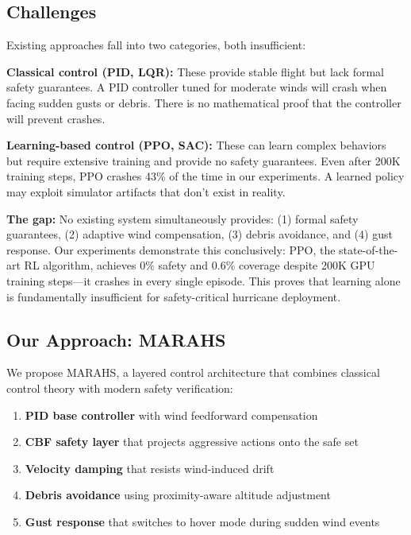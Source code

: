 \documentclass[10pt,twocolumn]{article}
\begin{document}
\subsection{Challenges}

Existing approaches fall into two categories, both insufficient:

\textbf{Classical control (PID, LQR):} These provide stable flight but lack formal safety guarantees. A PID controller tuned for moderate winds will crash when facing sudden gusts or debris. There is no mathematical proof that the controller will prevent crashes.

\textbf{Learning-based control (PPO, SAC):} These can learn complex behaviors but require extensive training and provide no safety guarantees. Even after 200K training steps, PPO crashes 43\% of the time in our experiments. A learned policy may exploit simulator artifacts that don't exist in reality.

\textbf{The gap:} No existing system simultaneously provides: (1) formal safety guarantees, (2) adaptive wind compensation, (3) debris avoidance, and (4) gust response. Our experiments demonstrate this conclusively: PPO, the state-of-the-art RL algorithm, achieves 0\% safety and 0.6\% coverage despite 200K GPU training steps---it crashes in every single episode. This proves that learning alone is fundamentally insufficient for safety-critical hurricane deployment.

\subsection{Our Approach: MARAHS}

We propose MARAHS, a layered control architecture that combines classical control theory with modern safety verification:

\begin{enumerate}
    \item \textbf{PID base controller} with wind feedforward compensation
    \item \textbf{CBF safety layer} that projects aggressive actions onto the safe set
    \item \textbf{Velocity damping} that resists wind-induced drift
    \item \textbf{Debris avoidance} using proximity-aware altitude adjustment
    \item \textbf{Gust response} that switches to hover mode during sudden wind events
\end{enumerate}
\end{document}
